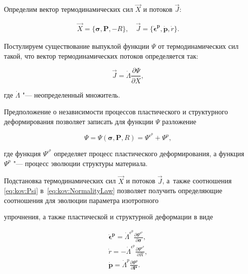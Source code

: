 Определим вектор термодинамических сил $\vec{X}$ и потоков $\vec{J}$:

\begin{gather*}

\vec{X}=\{\boldsymbol{\sigma},\boldsymbol{P},-R\},\quad 

\vec{J}=\{\boldsymbol{\dot{\epsilon}^{p}},\dot{\boldsymbol{p}},\dot{r}\}.

\end{gather*}

Постулируем существование выпуклой  функции $\Psi$ от термодинамических сил такой, что вектор термодинамических потоков определяется так:

\begin{equation}

\vec{J}=\dot{\Lambda}\frac{\partial \Psi}{\partial{\overline{X}}}, \label{eq:kov:NormalityLaw}

\end{equation}

где $\dot{\Lambda}$ "--- неопределенный множитель. 

Предположение о независимости процессов пластического и структурного деформирования позволяет записать для функции $\Psi$ разложение

\begin{equation}

\Psi=\Psi(\boldsymbol{\sigma}, \boldsymbol{P}, R)=\Psi^{\epsilon^p}+\Psi^p, \label{eq:kov:Psi}

\end{equation}

где функция $\Psi^{\epsilon^p}$ определяет процесс пластического деформирования, а функция $\Psi^p$ "--- процесс эволюции структуры материала.



Подстановка термодинамических сил $\vec{X}$ и потоков $\vec{J}$, а~также соотношения \eqref{eq:kov:Psi} в~\eqref{eq:kov:NormalityLaw} позволяет получить определяющие соотношения для эволюции параметра изотропного

упрочнения, а также  пластической и структурной деформации в виде

\begin{gather}

\boldsymbol{\dot{\epsilon}^{p}}=\dot{\Lambda}^{\epsilon^p} \frac{\partial{\Psi^{\epsilon^p}}}{\partial{\boldsymbol{\sigma}}}, \label{eq:kov:NormalityLawPlast}\\

\dot{r}= - \dot{\Lambda}^{\epsilon^p}\frac{\partial \Psi^{\epsilon^p}}{\partial{R}}, \label{eq:kov:NormalityLawR}\\

\dot{\boldsymbol{p}}=\dot{\Lambda}^{p}\frac{\partial \Psi^{p}}{\partial{\boldsymbol{P}}}. \label{eq:kov:NormalityLawP}

\end{gather}

